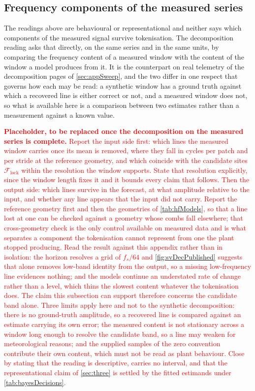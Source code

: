 \subsection{Frequency components of the measured series}

The readings above are behavioural or representational and neither says which components of the measured signal survive tokenisation. The decomposition reading asks that directly, on the same series and in the same units, by comparing the frequency content of a measured window with the content of the window a model produces from it. It is the counterpart on real telemetry of the decomposition pages of \autoref{sec:appSweep}, and the two differ in one respect that governs how each may be read: a synthetic window has a ground truth against which a recovered line is either correct or not, and a measured window does not, so what is available here is a comparison between two estimates rather than a measurement against a known value.

\textcolor{red}{\textbf{Placeholder, to be replaced once the decomposition on the measured series is complete.} Report the input side first: which lines the measured window carries once its mean is removed, where they fall in cycles per patch and per stride at the reference geometry, and which coincide with the candidate sites $\mathcal F_{\mathrm{lock}}$ within the resolution the window supports. State that resolution explicitly, since the window length fixes it and it bounds every claim that follows. Then the output side: which lines survive in the forecast, at what amplitude relative to the input, and whether any line appears that the input did not carry. Report the reference geometry first and then the geometries of \autoref{tab:hfModels}, so that a line lost at one can be checked against a geometry whose combs fall elsewhere; that cross-geometry check is the only control available on measured data and is what separates a component the tokenisation cannot represent from one the plant stopped producing. Read the result against this appendix rather than in isolation: the horizon resolves a grid of $f_s/64$ and \autoref{fig:svDecPublished} suggests that alone removes low-band identity from the output, so a missing low-frequency line evidences nothing; and the models continue an understated rate of change rather than a level, which thins the slowest content whatever the tokenisation does. The claim this subsection can support therefore concerns the candidate band alone. Three limits apply here and not to the synthetic decomposition: there is no ground-truth amplitude, so a recovered line is compared against an estimate carrying its own error; the measured content is not stationary across a window long enough to resolve the candidate band, so a line may weaken for meteorological reasons; and the supplied samples of the zero convention contribute their own content, which must not be read as plant behaviour. Close by stating that the reading is descriptive, carries no interval, and that the representational claim of \autoref{sec:three} is settled by the fitted estimands under \autoref{tab:bayesDecisions}.}
